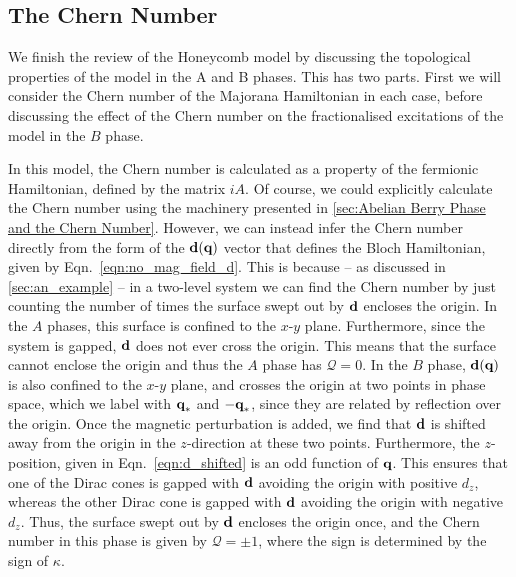 \subsection{The Chern Number} \label{sec:chern_number_and_anyon_stats}

We finish the review of the Honeycomb model by discussing the topological properties of the model in the A and B phases. This has two parts. First we will consider the Chern number of the Majorana Hamiltonian in each case, before discussing the effect of the Chern number on the fractionalised excitations of the model in the $B$ phase. 

In this model, the Chern number is calculated as a property of the fermionic Hamiltonian, defined by the matrix $iA$. Of course, we could explicitly calculate the Chern number using the machinery presented in \textsection\ref{sec:Abelian Berry Phase and the Chern Number}. However, we can instead infer the Chern number directly from the form of the $\textbf d(\textbf q)$ vector that defines the Bloch Hamiltonian, given by Eqn.~\ref{eqn:no_mag_field_d}. This is because -- as discussed in \textsection\ref{sec:an_example} -- in a two-level system we can find the Chern number by just counting the number of times the surface swept out by $\textbf d$ encloses the origin. In the $A$ phases, this surface is confined to the $x$-$y$ plane. Furthermore, since the system is gapped, $\textbf d$ does not ever cross the origin. This means that the surface cannot enclose the origin and thus the $A$ phase has $\mathcal Q = 0$. In the $B$ phase, $\textbf d(\textbf q)$ is also confined to the $x$-$y$ plane, and crosses the origin at two points in phase space, which we label with $ \textbf q_*$ and $-\textbf q_*$, since they are related by reflection over the origin. Once the magnetic perturbation is added, we find that $\textbf d$ is shifted away from the origin in the $z$-direction at these two points. Furthermore, the $z$-position, given in Eqn.~\ref{eqn:d_shifted} is an odd function of $\textbf q$. This ensures that one of the Dirac cones is gapped with $\textbf d$ avoiding the origin with positive $d_z$, whereas the other Dirac cone is gapped with $\textbf d$ avoiding the origin with negative $d_z$. Thus, the surface swept out by $\textbf d$ encloses the origin once, and the Chern number in this phase is given by $\mathcal Q = \pm 1$, where the sign is determined by the sign of $\kappa$.

